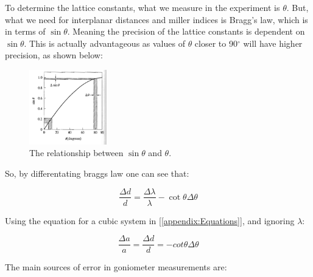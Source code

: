 \documentclass{article}
\begin{document}
To determine the lattice constants, what we measure in the experiment is $\theta$. But, what we need for interplanar distances and miller indices is Bragg's law, which is in terms of $\sin \theta$.
Meaning the precision of the lattice constants is dependent on $\sin \theta$. This is actually advantageous as values of $\theta$ closer to 90$^{\circ}$ will have higher precision, as shown below:

\begin{figure}[h]
	\centering
	\includegraphics[width=0.3\textwidth]{Figures/sintheta.png}
	\caption{The relationship between $\sin \theta$ and $\theta$.}
	\label{fig:sintheta}
\end{figure}

So, by differentating braggs law one can see that:

\begin{equation}
	\label{eq:error1}
	\frac{\Delta d}{d} = \frac{\Delta \lambda}{\lambda} - \cot \theta \Delta \theta
\end{equation}

Using the equation for a cubic system in [\ref{appendix:Equations}], and ignoring $\lambda$:

\begin{equation}
	\label{eq:error2}
	\frac{\Delta a}{a}= \frac{\Delta d}{d} = -cot \theta \Delta \theta
\end{equation}

The main sources of error in goniometer measurements are:
\end{document}

